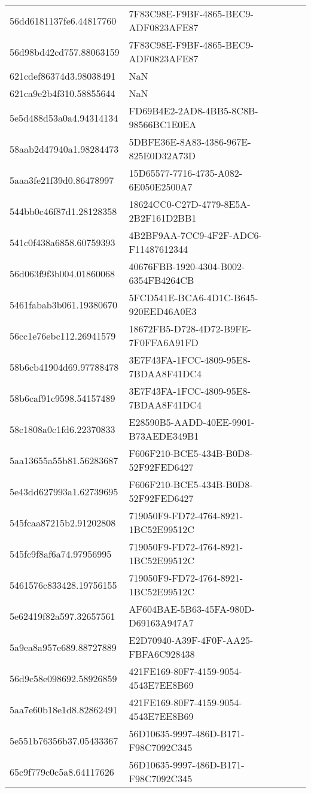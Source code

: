 \begin{tabular}{ll}
56dd6181137fe6.44817760 & 7F83C98E-F9BF-4865-BEC9-ADF0823AFE87 \\
56d98bd42cd757.88063159 & 7F83C98E-F9BF-4865-BEC9-ADF0823AFE87 \\
621cdef86374d3.98038491 & NaN \\
621ca9e2b4f310.58855644 & NaN \\
5e5d488d53a0a4.94314134 & FD69B4E2-2AD8-4BB5-8C8B-98566BC1E0EA \\
58aab2d47940a1.98284473 & 5DBFE36E-8A83-4386-967E-825E0D32A73D \\
5aaa3fe21f39d0.86478997 & 15D65577-7716-4735-A082-6E050E2500A7 \\
544bb0c46f87d1.28128358 & 18624CC0-C27D-4779-8E5A-2B2F161D2BB1 \\
541c0f438a6858.60759393 & 4B2BF9AA-7CC9-4F2F-ADC6-F11487612344 \\
56d063f9f3b004.01860068 & 40676FBB-1920-4304-B002-6354FB4264CB \\
5461fabab3b061.19380670 & 5FCD541E-BCA6-4D1C-B645-920EED46A0E3 \\
56cc1e76ebc112.26941579 & 18672FB5-D728-4D72-B9FE-7F0FFA6A91FD \\
58b6cb41904d69.97788478 & 3E7F43FA-1FCC-4809-95E8-7BDAA8F41DC4 \\
58b6caf91c9598.54157489 & 3E7F43FA-1FCC-4809-95E8-7BDAA8F41DC4 \\
58c1808a0c1fd6.22370833 & E28590B5-AADD-40EE-9901-B73AEDE349B1 \\
5aa13655a55b81.56283687 & F606F210-BCE5-434B-B0D8-52F92FED6427 \\
5e43dd627993a1.62739695 & F606F210-BCE5-434B-B0D8-52F92FED6427 \\
545fcaa87215b2.91202808 & 719050F9-FD72-4764-8921-1BC52E99512C \\
545fc9f8af6a74.97956995 & 719050F9-FD72-4764-8921-1BC52E99512C \\
5461576c833428.19756155 & 719050F9-FD72-4764-8921-1BC52E99512C \\
5e62419f82a597.32657561 & AF604BAE-5B63-45FA-980D-D69163A947A7 \\
5a9ea8a957e689.88727889 & E2D70940-A39F-4F0F-AA25-FBFA6C928438 \\
56d9c58e098692.58926859 & 421FE169-80F7-4159-9054-4543E7EE8B69 \\
5aa7e60b18e1d8.82862491 & 421FE169-80F7-4159-9054-4543E7EE8B69 \\
5e551b76356b37.05433367 & 56D10635-9997-486D-B171-F98C7092C345 \\
65c9f779c0c5a8.64117626 & 56D10635-9997-486D-B171-F98C7092C345 \\

\end{tabular}
